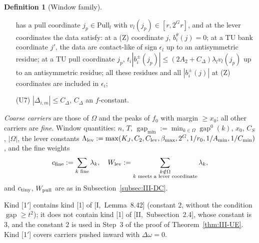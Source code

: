 \documentclass[10pt]{amsart}
\theoremstyle{definition}
\newtheorem{definition}[theorem]{Definition}
\theoremstyle{remark}
\newcommand{\gap}{\operatorname{gap}}
\begin{document}
\begin{definition}[Window family]
\begin{enumerate}
has a pull coordinate $j_p\in\mathrm{Pull}_l$ with $v_l(j_p)\in[r,2^Gr]$, and at the lever coordinates the data
satisfy: at a (Z) coordinate $j$, $b^\theta_i(j)=0$; at a TU bank coordinate
$j'$, the data are contact-like of sign $\epsilon_l$ up to an antisymmetric
residue; at a TU pull coordinate $j_p$, $t_i|b^\pm_i(j_p)|\le(2A_2+C_\Delta)
\lambda_lv_l(j_p)$ up to an antisymmetric residue; all these residues and all
$|b^\pm_i(j)|$ at (Z) coordinates are included in $\epsilon_i$;
\item[(U7)] $|\Delta_{i,m}|\le C_\Delta$, $C_\Delta$ an $f$-constant.
\end{enumerate}
\emph{Coarse carriers} are those of $\Omega$ and the peaks of $f_0$ with margin
$\ge x_0$; all other carriers are \emph{fine}.  Window quantities: $n$, $T$,
$\gap_{\min}:=\min_{k\in\Omega}\gap^0(k)$, $x_0$, $C_S$, $|\Omega|$, the lever
constants $\Lambda_{\rm lev}:=\max(K_J,C_2,C_{\rm lev},\beta_{\max},2^G,1/r_0,
1/A_{\min},1/C_{\min})$, and the fine weights
\[
 c_{\rm fine}:=\sum_{k\text{ fine}}\lambda_k,\quad
 W_{\rm lev}:=\sum_{\substack{k\notin\Omega\\ k\text{ meets a lever coordinate}}}
 \lambda_k,
\]
and $c_{\rm tiny}$, $W_{\rm pull}$ are as in Subsection~\ref{subsec:III-DC}.
\end{definition}

Kind [1$'$] contains kind [1] of [I,~Lemma~8.42] (constant $2$, without
the condition $\gap\ge t^2$); it does not contain kind [1] of
[II,~Subsection~2.4], whose constant is $3$, and the constant $2$ is used
in Step~3 of the proof of Theorem~\ref{thm:III-UE}.  Kind [1$'$] covers
carriers pushed inward with $\Delta\omega=0$.
\end{document}
